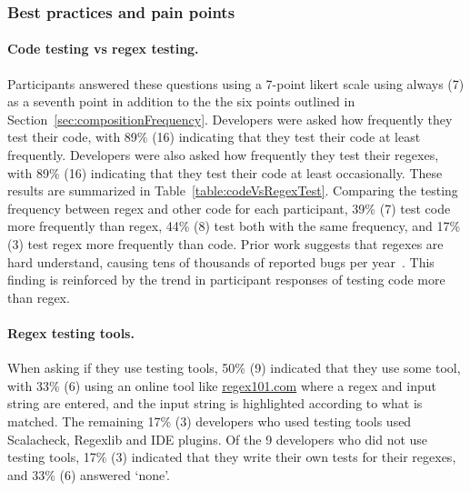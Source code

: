 

\subsubsection{Best practices and pain points}
\paragraph{Code testing vs regex testing.}\label{sec:surveyTesting}  Participants answered these questions using a 7-point likert scale using always (7) as a seventh point in addition to the the six points outlined in Section~\ref{sec:compositionFrequency}. Developers were asked how frequently they test their code, with 89\% (16) indicating that they test their code at least frequently.  Developers were also asked how frequently they test their regexes, with 89\% (16) indicating that they test their code at least occasionally.  These results are summarized in Table~\ref{table:codeVsRegexTest}. Comparing the testing frequency between regex and other code for each participant, 39\% (7) test code more frequently than regex, 44\% (8) test both with the same frequency, and 17\% (3) test regex more frequently than code.  Prior work suggests that regexes are hard understand, causing tens of thousands of reported bugs per year~.  This finding is reinforced by the trend in participant responses of testing code more than regex.

\paragraph{Regex testing tools.} When asking if they use testing tools, 50\% (9) indicated that they use some tool, with 33\% (6) using an online tool like \url{regex101.com} where a regex and input string are entered, and the input string is highlighted according to what is matched.  The remaining 17\% (3) developers who used testing tools used Scalacheck, Regexlib and IDE plugins.
Of the 9 developers who did not use testing tools, 17\% (3) indicated that they write their own tests for their regexes, and 33\% (6) answered `none'.

